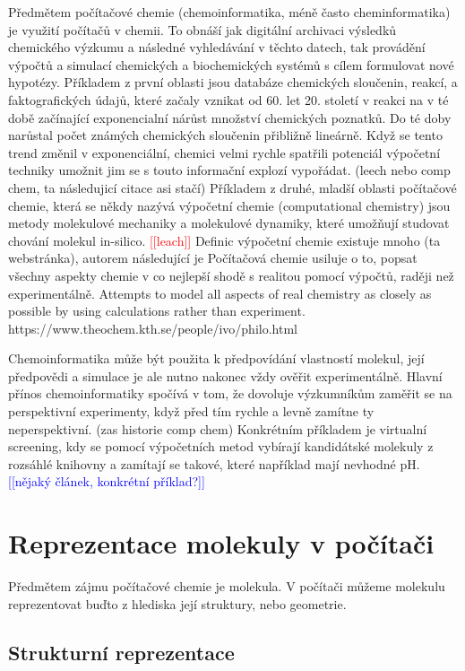 \documentclass[10pt,draft,oneside]{fithesis2}
\newcommand\fixme[1]{\textcolor{red}{[[#1]]}}
\newcommand\todo[1]{\textcolor{blue}{[[#1]]}}
\begin{document}
Předmětem počítačové chemie (chemoinformatika, méně často cheminformatika) je využití počítačů v chemii. To obnáší jak digitální archivaci výsledků chemického výzkumu a následné vyhledávání v těchto datech, tak provádění výpočtů a simulací chemických a biochemických systémů s cílem formulovat nové hypotézy. Příkladem z první oblasti jsou databáze chemických sloučenin, reakcí, a faktografických údajů, které začaly vznikat od 60. let 20. století v reakci na v té době začínající exponencialní nárůst množství chemických poznatků. Do té doby narůstal počet známých chemických sloučenin přibližně lineárně. Když se tento trend změnil v exponenciální, chemici velmi rychle spatřili potenciál výpočetní techniky umožnit jim se s touto informační explozí vypořádat. (leech nebo comp chem, ta následujicí citace asi stačí) Příkladem z druhé, mladší oblasti počítačové chemie, která se někdy nazývá výpočetní chemie (computational chemistry) jsou metody molekulové mechaniky a molekulové dynamiky, které umožňují studovat chování molekul in-silico. \fixme{leach} Definic výpočetní chemie existuje mnoho (ta webstránka), autorem následující je Počítačová chemie usiluje o to, popsat všechny aspekty chemie v co nejlepší shodě s realitou pomocí výpočtů, raději než experimentálně. Attempts to model all aspects of real chemistry as closely as possible by using calculations rather than experiment. https://www.theochem.kth.se/people/ivo/philo.html

Chemoinformatika může být použita k předpovídání vlastností molekul, její předpovědi a simulace je ale nutno nakonec vždy ověřit experimentálně. Hlavní přínos chemoinformatiky spočívá v tom, že dovoluje výzkumníkům zaměřit se na perspektivní experimenty, když před tím rychle a levně zamítne ty neperspektivní. (zas historie comp chem) Konkrétním příkladem je virtualní screening, kdy se pomocí výpočetních metod vybírají kandidátské molekuly z rozsáhlé knihovny a zamítají se takové, které například mají nevhodné pH. \todo{nějaký článek, konkrétní příklad?}

\section{Reprezentace molekuly v počítači}

Předmětem zájmu počítačové chemie je molekula. V počítači můžeme molekulu reprezentovat buďto z hlediska její struktury, nebo geometrie.

\subsection{Strukturní reprezentace}
\end{document}

